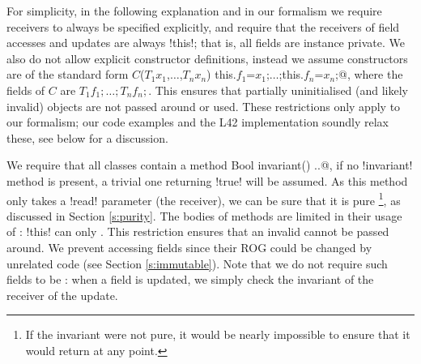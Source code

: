 For simplicity, in the following explanation and in our formalism
we require 
receivers to always be specified explicitly, and require that the receivers of field accesses and updates are always \Q!this!; that is, all fields are instance private.
We also do not allow explicit constructor definitions, instead we assume constructors are of the standard form \Q@$C$($T_1 x_1$,$\ldots$,$T_n x_n$) {this.$f_1$=$x_1$;$\ldots$;this.$f_n$=$x_n$;}@, where the fields of $C$ are $T_1 f_1;\ldots; T_n f_n;$. This ensures that partially uninitialised (and likely invalid) objects are not passed around or used. 
These restrictions only apply to our formalism; our code examples and the L42 implementation soundly relax these, see below for a discussion.%

We require that all classes contain a \Q@read method Bool invariant() {..}@, if no \Q!invariant! method is present, a trivial one returning \Q!true! will be assumed. As this method only takes a \Q!read! parameter (the receiver), we can be sure that it is pure \footnote{If the invariant were not pure, it would be nearly impossible to ensure that it would return \Q@true@ at any point.}, as discussed in Section \ref{s:purity}.
The bodies of \Q@invariant@ methods are limited in their usage of \Q@this@: \Q!this! can only  . This restriction ensures that 
an invalid \Q@this@ cannot be passed around.
We prevent accessing \Q@mut@ fields since their ROG could be changed by unrelated code (see Section \ref{s:immutable}).
Note that we do not require such fields to be \Q@final@: when a field is updated, we simply check the invariant of the receiver of the update.

